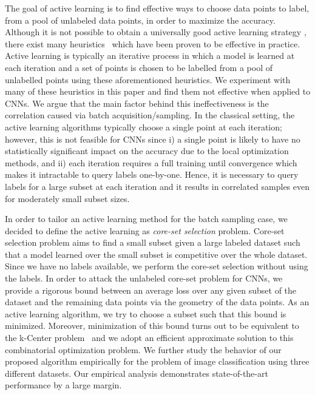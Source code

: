 \documentclass{article} %
\begin{document}
The goal of active learning is to find effective ways to choose data points to label, from a pool of unlabeled data points, in order to maximize the
accuracy. Although it is not possible to obtain a universally good active learning strategy \citep{dasgupta2004analysis}, there exist many
heuristics~\citep{settles2010active} which have been proven to be effective in practice. Active learning is typically an iterative process in which a
model is learned at each iteration and a set of points is chosen to be labelled from a pool of unlabelled points using these aforementioned heuristics. We experiment
with many of these heuristics in this paper and find them not effective when applied to CNNs. We argue that
the main factor behind this ineffectiveness is the correlation caused via batch acquisition/sampling. In the classical setting, the active learning algorithms
typically choose a single point at each iteration; however, this is not feasible for CNNs since i) a single point is likely to have no statistically
significant impact on the accuracy due to the local optimization methods, and ii) each iteration requires a full training until convergence which
makes it intractable to query labels one-by-one. Hence, it is necessary to query labels for a large subset at each iteration and it results in correlated samples even for
moderately small subset sizes.

In order to tailor an active learning method for the batch sampling case, we decided to define the active learning as \emph{core-set selection} problem. Core-set selection problem aims to find a small subset given a large labeled dataset such that a model learned over the small subset is competitive over the whole dataset. Since
we have no labels available, we perform the core-set selection without using
the labels. In order to attack the unlabeled core-set problem for CNNs, we provide a rigorous bound between an average loss over any given subset of the dataset and
the remaining data points via the geometry of the data points. As an active learning algorithm, we try to choose a subset such that this bound is minimized. Moreover, minimization of this bound turns out to be equivalent to the k-Center problem~\citep{facility} and we adopt an efficient approximate solution to this 
combinatorial optimization problem. We further study the behavior of our proposed algorithm empirically for the problem of image classification using three different datasets. Our empirical analysis demonstrates state-of-the-art performance by a large margin. 
\end{document}
